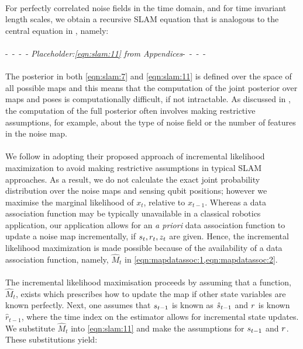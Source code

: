 \\
For perfectly correlated noise fields in the time domain, and for time invariant length scales, we obtain a recursive SLAM equation that is analogous to the central equation in \cite{thrun2001probabilistic}, namely:\\
\\
-~-~-~- \textit{Placeholder:\cref{eqn:slam:11} from Appendices}-~-~-~-  \\
\\

The posterior in both \cref{eqn:slam:7} and \cref{eqn:slam:11} is defined over the space of all possible maps and this means that the computation of the joint posterior over maps and poses is computationally difficult,  if not intractable. As discussed in \cite{thrun2001probabilistic}, the computation of the full posterior often involves making restrictive assumptions, for example, about the type of noise field or the number of features in the noise map. \\
\\
We follow \cite{thrun2001probabilistic} in adopting their proposed approach of incremental likelihood maximization to avoid making restrictive assumptions in typical SLAM approaches. As a result, we do not calculate the exact joint probability distribution over the noise maps and sensing qubit positions; however we maximise the marginal likelihood of $x_{t}$, relative to  $x_{t-1}$.  Whereas a data association function may be typically unavailable in a classical robotics application, our application allows for an \textit{a priori }  data association function to update a noise map incrementally, if $s_{ t}, r_{ t}, z_t$ are given. Hence, the incremental likelihood maximization is made possible because of the availability of a data association function, namely,  $\hat{M}_t$ in \cref{eqn:mapdatassoc:1,eqn:mapdatassoc:2}. \\
\\
The incremental likelihood maximisation proceeds by assuming that a function, $\hat{M}_t$, exists which prescribes how to update the map if other state variables are known perfectly. Next, one assumes that $s_{ t-1}$ is known as $\hat{s}_{ t-1}$ and $r_{ }$ is known $\hat{r}_{t-1}$, where the time index on the estimator allows for incremental state updates. We substitute $\hat{M}_t$ into \cref{eqn:slam:11} and make the assumptions for $s_{ t-1}$  and $r_{ }$. These substitutions yield: \\

